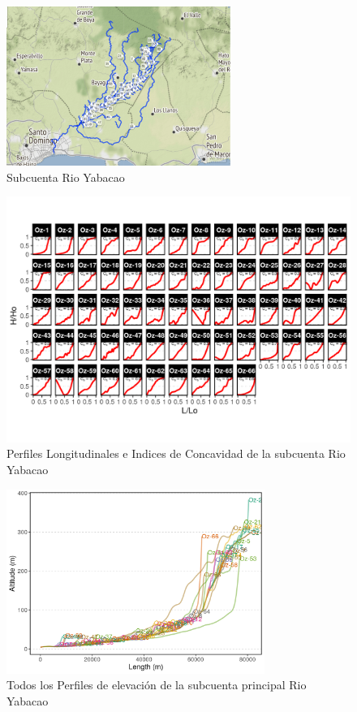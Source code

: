 \documentclass[11pt,]{article}
\begin{document}
\begin{figure}
\centering
\includegraphics[width=0.65000\textwidth]{Productos Generados/p_yabacao.png}
\caption{\label{fig:LFP_yabacao0} Subcuenta Rio Yabacao}
\end{figure}

\begin{figure}
\centering
\includegraphics[width=1.00000\textwidth]{Productos Generados/p_c_yabacao.png}
\caption{\label{fig:LFP_yabacao1} Perfiles Longitudinales e Indices de
Concavidad de la subcuenta Rio Yabacao}
\end{figure}

\begin{figure}
\centering
\includegraphics[width=0.75000\textwidth]{Productos Generados/p_c_yabacao_todos.png}
\caption{\label{fig:LFP_yabacao2} Todos los Perfiles de elevación de la
subcuenta principal Rio Yabacao}
\end{figure}
\end{document}
